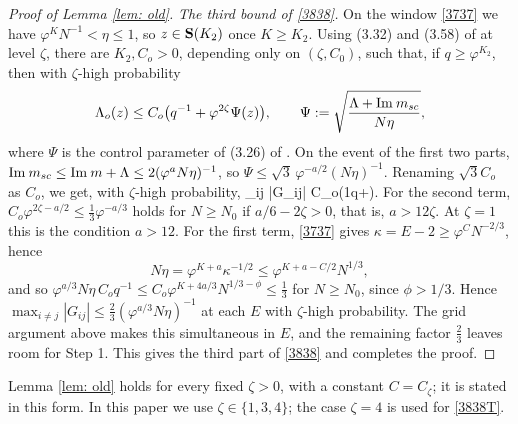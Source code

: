 \begin{proof}[Proof of Lemma \ref{lem: old}]
{\it The third bound of \eqref{3838}.} On the window \eqref{3737} we have $\varphi^{K}N^{-1}<\eta\le1$, so $z\in{\bf S}(K_2)$ once $K\ge K_2$. Using (3.32) and (3.58) of \cite{EKYY1} at level $\zeta$, there are $K_2,C_o>0$, depending only on $(\zeta,C_0)$, such that, if $q\ge\varphi^{K_2}$, then with $\zeta$-high probability
$$
\Lambda_o(z)\le C_o\big(q^{-1}+\varphi^{2\zeta}\Psi(z)\big),\qquad \Psi:=\sqrt{\frac{\Lambda+\mathrm{Im}\: m_{sc}}{N\eta}},
$$
where $\Psi$ is the control parameter of (3.26) of \cite{EKYY1}. On the event of the first two parts, $\mathrm{Im}\: m_{sc}\le\mathrm{Im}\: m+\Lambda\le2(\varphi^aN\eta)^{-1}$, so $\Psi\le\sqrt3\,\varphi^{-a/2}(N\eta)^{-1}$. Renaming $\sqrt3C_o$ as $C_o$, we get, with $\zeta$-high probability,
\be\label{tyzz}
\max_{i\ne j} |G_{ij}| \leq C_o\Big(\frac1q+\Big).
\ee
For the second term, $C_o\varphi^{2\zeta-a/2}\le\frac13\varphi^{-a/3}$ holds for $N\ge N_0$ if $a/6-2\zeta>0$, that is, $a>12\zeta$. At $\zeta=1$ this is the condition $a>12$. For the first term, \eqref{3737} gives $\kappa=E-2\ge\varphi^CN^{-2/3}$, hence
$$
N\eta=\varphi^{K+a}\kappa^{-1/2}\le\varphi^{K+a-C/2}N^{1/3},
$$
and so $\varphi^{a/3}N\eta\,C_oq^{-1}\le C_o\varphi^{K+4a/3}N^{1/3-\phi}\le\frac13$ for $N\ge N_0$, since $\phi>1/3$. Hence $\max_{i\ne j}|G_{ij}|\le\frac23(\varphi^{a/3}N\eta)^{-1}$ at each $E$ with $\zeta$-high probability. The grid argument above makes this simultaneous in $E$, and the remaining factor $\frac23$ leaves room for Step 1. This gives the third part of \eqref{3838} and completes the proof.

\end{proof}

\begin{rem} \label{prozeta}
Lemma \ref{lem: old} holds for every fixed $\zeta>0$, with a constant $C=C_\zeta$; it is stated in this form. In this paper we use $\zeta\in\{1,3,4\}$; the case $\zeta=4$ is used for \eqref{3838T}.
\end{rem}
